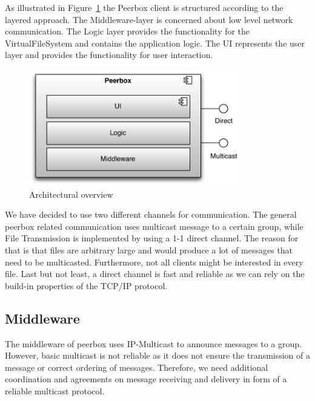 
As illustrated in Figure~\ref{fig:figures_archOverview} the Peerbox client is structured according to the layered approach. The Middleware-layer is concerned about low level network communication. The Logic layer provides the functionality for the VirtualFileSystem and contains the application logic. The UI represents the user layer and provides the functionality for user interaction.

\begin{figure}[htbp]
    \centering
        \includegraphics[height=2in]{figures/archOverview.pdf}
    \caption{Architectural overview}
    \label{fig:figures_archOverview}
\end{figure}

We have decided to use two different channels for communication. The general peerbox related communication uses multicast message to a certain group, while File Transmission is implemented by using a 1-1 direct channel. 
The reason for that is that files are arbitrary large and would produce a lot of messages that need to be multicasted. Furthermore, not all clients might be interested in every file. Last but not least, a direct channel is fast and reliable as we can rely on the build-in properties of the TCP/IP protocol. 

\subsection{Middleware}

The middleware of peerbox uses IP-Multicast to announce messages to a group. However, basic multicast is not reliable as it does not ensure the transmission of a message or correct ordering of messages. 
Therefore, we need additional coordination and agreements on message receiving and delivery in form of a reliable multicast protocol.



